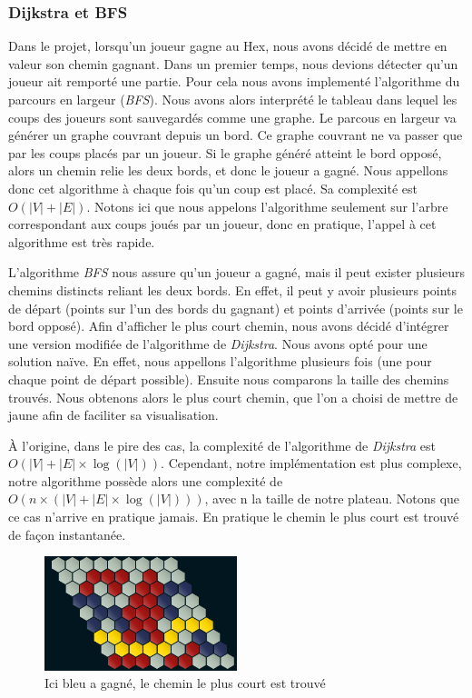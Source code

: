 \subsubsection{Dijkstra et BFS}
Dans le projet, lorsqu'un joueur gagne au Hex, nous avons décidé de mettre en valeur son chemin gagnant.
Dans un premier temps, nous devions détecter qu'un joueur ait remporté une partie. Pour cela nous avons implementé l'algorithme du parcours
en largeur (\emph{BFS}). Nous avons alors interprété le tableau dans lequel les coups des joueurs sont sauvegardés comme une graphe. Le parcous en largeur
va générer un graphe couvrant depuis un bord. Ce graphe couvrant ne va passer que par les coups placés par un joueur. Si le graphe généré atteint le bord opposé,
alors un chemin relie les deux bords, et donc le joueur a gagné. Nous appellons donc cet algorithme à chaque fois qu'un coup est placé. Sa complexité est $O(\lvert V \rvert + \lvert E \rvert)$.
Notons ici que nous appelons l'algorithme seulement sur l'arbre correspondant aux coups joués par un joueur, donc en pratique, l'appel à cet algorithme
est très rapide.

L'algorithme \emph{BFS} nous assure qu'un joueur a gagné, mais il peut exister plusieurs chemins distincts reliant les deux bords. En effet,
il peut y avoir plusieurs points de départ (points sur l'un des bords du gagnant) et points d'arrivée (points sur le bord opposé).
Afin d'afficher le plus court chemin, nous avons décidé d'intégrer une version modifiée de l'algorithme de \emph{Dijkstra}.
Nous avons opté pour une solution naïve. En effet, nous appellons l'algorithme plusieurs fois (une pour chaque point de départ possible).
Ensuite nous comparons la taille des chemins trouvés. Nous obtenons alors le plus court chemin, que l'on a choisi de mettre de jaune 
afin de faciliter sa visualisation.

À l'origine, dans le pire des cas, la complexité de l'algorithme de \emph{Dijkstra} est $O(\lvert V \rvert + \lvert E \rvert \times \log(\lvert V \rvert))$.
Cependant, notre implémentation est plus complexe, notre algorithme possède alors une complexité de $O(n \times (\lvert V \rvert+ \lvert E \rvert\times \log(\lvert V \rvert)))$, avec n la taille de notre plateau.
Notons que ce cas n'arrive en pratique jamais. En pratique le chemin le plus court est trouvé de façon instantanée.

\begin{figure}[h]
    \begin{center}
        \includegraphics[width=0.5\textwidth]{root/chemin_gagnant.png}
    \end{center}
    \caption{Ici bleu a gagné, le chemin le plus court est trouvé}\label{fig:chemin_gagnant}
\end{figure}